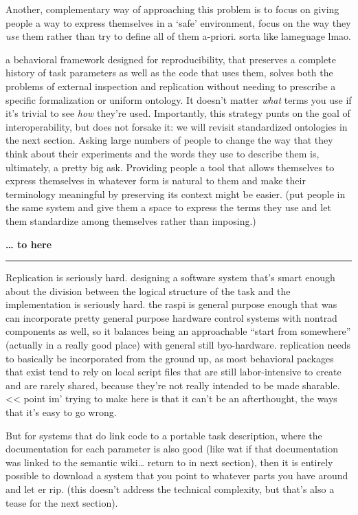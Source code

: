 \documentclass{article}
\begin{document}
Another, complementary way of approaching this problem is to focus on
giving people a way to express themselves in a `safe' environment, focus
on the way they \emph{use} them rather than try to define all of them
a-priori. sorta like lameguage lmao.

a behavioral framework designed for reproducibility, that preserves a
complete history of task parameters as well as the code that uses them,
solves both the problems of external inspection and replication without
needing to prescribe a specific formalization or uniform ontology. It
doesn't matter \emph{what} terms you use if it's trivial to see
\emph{how} they're used. Importantly, this strategy punts on the goal of
interoperability, but does not forsake it: we will revisit standardized
ontologies in the next section. Asking large numbers of people to change
the way that they think about their experiments and the words they use
to describe them is, ultimately, a pretty big ask. Providing people a
tool that allows themselves to express themselves in whatever form is
natural to them and make their terminology meaningful by preserving its
context might be easier. (put people in the same system and give them a
space to express the terms they use and let them standardize among
themselves rather than imposing.)

\textbf{\ldots{} to here}

\begin{center}\rule{0.5\linewidth}{0.5pt}\end{center}

Replication is seriously hard. designing a software system that's smart
enough about the division between the logical structure of the task and
the implementation is seriously hard. the raspi is general purpose
enough that was can incorporate pretty general purpose hardware control
systems with nontrad components as well, so it balances being an
approachable ``start from somewhere'' (actually in a really good place)
with general still byo-hardware. replication needs to basically be
incorporated from the ground up, as most behavioral packages that exist
tend to rely on local script files that are still labor-intensive to
create and are rarely shared, because they're not really intended to be
made sharable. \textless\textless{} point im' trying to make here is
that it can't be an afterthought, the ways that it's easy to go wrong.

But for systems that do link code to a portable task description, where
the documentation for each parameter is also good (like wat if that
documentation was linked to the semantic wiki\ldots{} return to in next
section), then it is entirely possible to download a system that you
point to whatever parts you have around and let er rip. (this doesn't
address the technical complexity, but that's also a tease for the next
section).
\end{document}
